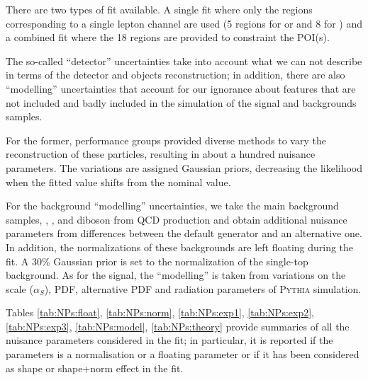
There are two types of fit available.
A single fit where only the regions corresponding to a single lepton channel are used 
(5 regions for \zlep or \tlep and 8 for \olep)
and a combined fit where the 18 regions are provided to constraint the POI(s).


The so-called ``detector'' uncertainties take into account what we can not describe
in terms of the detector and objects reconstruction;
in addition, there are also ``modelling'' uncertainties that account for our ignorance about features 
that are not included and badly included in
the simulation of the signal and backgrounds samples.

For the former, performance groups provided diverse methods to vary the reconstruction of these particles, 
resulting in about a hundred nuisance parameters.
The variations are assigned Gaussian priors, decreasing the likelihood
when the fitted value shifts from the nominal value.


For the background ``modelling'' uncertainties, we take the main background samples, 
\ttbar, \Wjets, \Zjets and diboson 
from QCD production 
and obtain additional nuisance parameters from differences between the default generator and an alternative one.
In addition, the normalizations of these backgrounds are left floating during the fit.
A 30\% Gaussian prior is set to the normalization of the single-top background.
As for the signal, the ``modelling'' is taken from variations on the scale ($\alpha_S$), PDF, alternative PDF 
and radiation parameters of \textsc{Pythia} simulation.

\clearpage
Tables 
\ref{tab:NPs:float},
\ref{tab:NPs:norm},
\ref{tab:NPs:exp1},
\ref{tab:NPs:exp2},
\ref{tab:NPs:exp3},
\ref{tab:NPs:model},
\ref{tab:NPs:theory}
provide summaries of all the nuisance parameters considered in the fit; 
in particular, it is reported if the parameters is a normalisation or a floating parameter 
or if it has been considered as shape or shape+norm effect in the fit.

